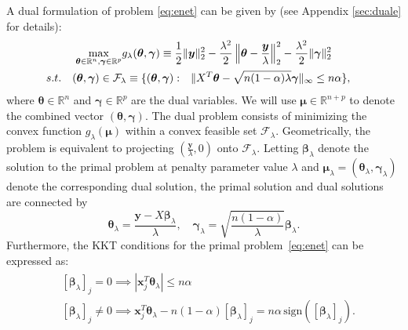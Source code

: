 A dual formulation of problem \eqref{eq:enet} can be given by (see Appendix \ref{sec:duale} for details):
\begin{gather}
        \label{eq:dualtheta}
        \underset{\boldsymbol\theta\in \mathbb{R}^{ n},\boldsymbol\gamma\in\mathbb{R}^p}{\mathrm{max}}g_\lambda(\boldsymbol\theta,\boldsymbol\gamma)\equiv\frac{1}{2}\lVert\boldsymbol y\rVert_2^2-\frac{\lambda^2}{2}\left\Vert\boldsymbol\theta-\frac{\boldsymbol y}{\lambda}\right\Vert_2^2-\frac{\lambda^2}{2}\lVert\boldsymbol\gamma\rVert_2^2\\
        \begin{aligned}s.t.\quad (\boldsymbol\theta,\boldsymbol\gamma)\in \mathcal{F}_\lambda\equiv\{(\boldsymbol\theta,\boldsymbol\gamma):\quad
            &\lVert X^T\boldsymbol\theta-\sqrt{n(1-\alpha)\lambda}\boldsymbol\gamma\rVert_\infty\leq n\alpha\}\nonumber,
        \end{aligned}
\end{gather}
where $\boldsymbol\theta\in \mathbb{R}^{n}$ and $\boldsymbol\gamma\in\mathbb{R}^p$ are the dual variables. We will use $\boldsymbol\mu\in \mathbb{R}^{n+p}$ to denote the combined vector $(\boldsymbol \theta,\boldsymbol\gamma)$. The dual problem consists of minimizing the convex function $g_\lambda(\boldsymbol\mu)$ within a convex feasible set $\mathcal{F}_\lambda$. Geometrically, the problem is equivalent to projecting $(\frac{\boldsymbol y}{\lambda},0)$ onto $\mathcal{F}_\lambda$. Letting $\boldsymbol\beta_\lambda$ denote the solution to the primal problem at penalty parameter value $\lambda$ and $\boldsymbol\mu_{\lambda}=(\boldsymbol\theta_{\lambda},\boldsymbol\gamma_\lambda)$ denote the corresponding dual solution, the primal solution and dual solutions are connected by
\begin{equation}
    \label{eq:dualprimal}
    \boldsymbol\theta_\lambda=\frac{\boldsymbol y-X\boldsymbol\beta_\lambda}{\lambda},\quad \boldsymbol\gamma_\lambda=\sqrt{\frac{n(1-\alpha)}{\lambda}}\boldsymbol\beta_\lambda.
\end{equation}
Furthermore, the KKT conditions for the primal problem~\eqref{eq:enet} can be expressed as:
\begin{gather}
    \label{eq:kkte}
    \begin{aligned}&[\boldsymbol\beta_\lambda]_{j}=0\implies|\boldsymbol x_j^T\boldsymbol\theta_\lambda|\leq n\alpha\\
    & [\boldsymbol\beta_\lambda]_{j}\neq0\implies  \boldsymbol x_j^T\boldsymbol\theta_\lambda-n(1-\alpha)[\boldsymbol\beta_\lambda]_{j}=n\alpha\,\textrm{sign}([\boldsymbol\beta_\lambda]_{j}).
    \end{aligned}
\end{gather}
